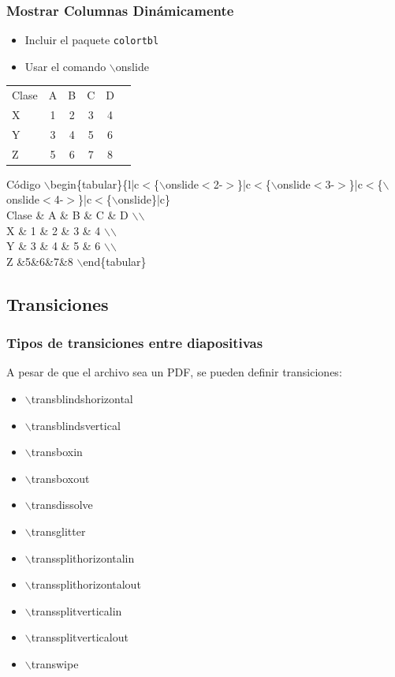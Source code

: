 \documentclass[aspectratio=43]{beamer}%
\begin{document}
\begin{frame}
\frametitle{\textbf{Mostrar Columnas Dinámicamente}}
\justifying
 \begin{itemize}\justifying
  \item Incluir el paquete \texttt{colortbl}
  \item Usar el comando $\backslash$onslide
\end{itemize}

\begin{center}
\begin{tabular}{l|c<{\onslide<2->}|c<{\onslide<3->}|c<{\onslide<4->}|c<{\onslide}|c}
Clase & A & B & C & D \\ 
X & 1 & 2 & 3 & 4 \\ 
Y & 3 & 4 & 5 & 6 \\ 
Z &5&6&7&8 
\end{tabular}
\end{center}

\begin{exampleblock}{Código}
$\backslash$begin\{tabular\}\{l|c$<$\{$\backslash$onslide$<$2-$>$\}|c$<$\{$\backslash$onslide$<$3-$>$\}|c$<$\{$\backslash$onslide$<$4-$>$\}|c$<$\{$\backslash$onslide\}|c\}\\
Clase \& A \& B \& C \& D $\backslash$$\backslash$\\ 
X \& 1 \& 2 \& 3 \& 4 $\backslash$$\backslash$\\ 
Y \& 3 \& 4 \& 5 \& 6 $\backslash$$\backslash$\\ 
Z \&5\&6\&7\&8 
$\backslash$end\{tabular\}
\end{exampleblock}

\end{frame}

\subsection{Transiciones}
\begin{frame}[fragile]
\frametitle{\textbf{Tipos de transiciones entre diapositivas}}
\justifying
 A pesar de que el archivo sea un PDF, se pueden definir transiciones:
 \begin{itemize}\justifying
  \item $\backslash$transblindshorizontal
  \item $\backslash$transblindsvertical
  \item $\backslash$transboxin
  \item $\backslash$transboxout
  \item $\backslash$transdissolve
  \item $\backslash$transglitter
  \item $\backslash$transsplithorizontalin
  \item $\backslash$transsplithorizontalout
  \item $\backslash$transsplitverticalin
  \item $\backslash$transsplitverticalout
  \item $\backslash$transwipe
\end{itemize}

\end{frame}
\transdissolve
\end{document}
